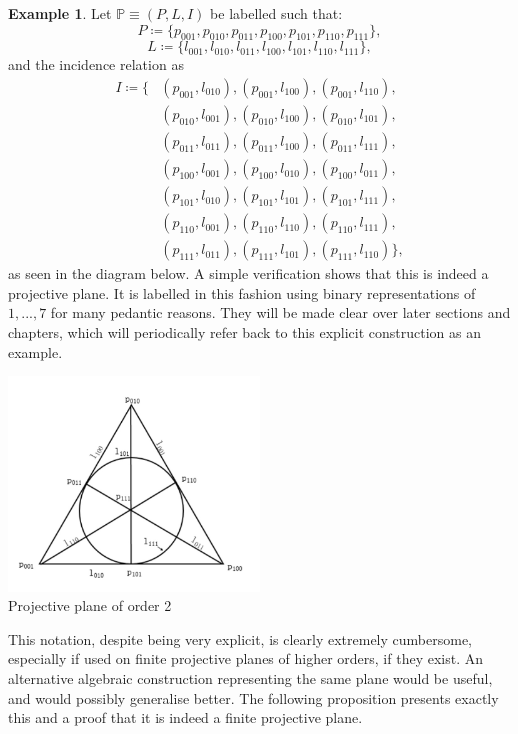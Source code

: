 \documentclass{report}
\renewcommand{\P}{\mathbb{P}}
\theoremstyle{definition}\newtheorem*{definition}{Definition}
\theoremstyle{definition}\newtheorem*{example}{Example}
\theoremstyle{remark}\newtheorem*{remark}{Remark}
\begin{document}
\begin{example}
Let $ \P \equiv (P, L, I) $ be labelled such that: $$ P \coloneqq \{ p_{001}, p_{010}, p_{011}, p_{100}, p_{101}, p_{110}, p_{111} \}, $$ $$ L \coloneqq \{ l_{001}, l_{010}, l_{011}, l_{100}, l_{101}, l_{110}, l_{111} \}, $$ and the incidence relation as
\begin{align*}
I \coloneqq \{
& (p_{001}, l_{010}), (p_{001}, l_{100}), (p_{001}, l_{110}), \\
& (p_{010}, l_{001}), (p_{010}, l_{100}), (p_{010}, l_{101}), \\
& (p_{011}, l_{011}), (p_{011}, l_{100}), (p_{011}, l_{111}), \\
& (p_{100}, l_{001}), (p_{100}, l_{010}), (p_{100}, l_{011}), \\
& (p_{101}, l_{010}), (p_{101}, l_{101}), (p_{101}, l_{111}), \\
& (p_{110}, l_{001}), (p_{110}, l_{110}), (p_{110}, l_{111}), \\
& (p_{111}, l_{011}), (p_{111}, l_{101}), (p_{111}, l_{110}) \},
\end{align*}
as seen in the diagram below. A simple verification shows that this is indeed a projective plane. It is labelled in this fashion using binary representations of $ 1, ..., 7 $ for many pedantic reasons. They will be made clear over later sections and chapters, which will periodically refer back to this explicit construction as an example.
\begin{center}
\includegraphics[width=0.5\textwidth]{fano_plane.jpg} \\
Projective plane of order 2
\end{center}
\end{example}

This notation, despite being very explicit, is clearly extremely cumbersome, especially if used on finite projective planes of higher orders, if they exist. An alternative algebraic construction representing the same plane would be useful, and would possibly generalise better. The following proposition presents exactly this and a proof that it is indeed a finite projective plane.
\end{document}
